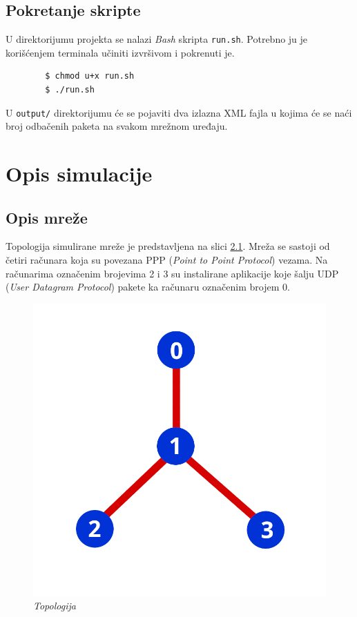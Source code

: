 \documentclass[a4paper, 12pt, projekat]{etf}
\begin{document}
	\section{Pokretanje skripte}
	U direktorijumu projekta se nalazi \emph{Bash} skripta \verb|run.sh|. Potrebno ju je korišćenjem terminala učiniti izvršivom i pokrenuti je.
	\begin{verbatim}
		$ chmod u+x run.sh
		$ ./run.sh
	\end{verbatim}
	U \verb|output/| direktorijumu će se pojaviti dva izlazna XML fajla u kojima će se naći broj odbačenih paketa na svakom mrežnom uređaju.
	
	\chapter{Opis simulacije}
	\section{Opis mreže}
	Topologija simulirane mreže je predstavljena na slici \ref{fig:topologija}. Mreža se sastoji od četiri računara koja su povezana PPP (\emph{Point to Point Protocol}) vezama. Na računarima označenim brojevima 2 i 3 su instalirane aplikacije koje šalju UDP (\emph{User Datagram Protocol}) pakete ka računaru označenim brojem 0. 
	\begin{figure}[htb]
		\centering
		\includegraphics[width=.6\textwidth]{../slike/topologija.png}
		\caption{\emph{Topologija}}
		\label{fig:topologija}
	\end{figure}
	
\end{document}
